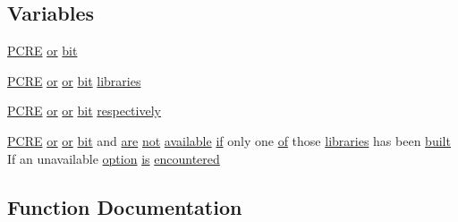 \subsection*{Variables}
\begin{DoxyCompactItemize}
\item 
\hyperlink{pcre_8txt_a970782a5ef22596881e664deb789f171}{P\+C\+RE} \hyperlink{pcretest_8txt_a1e1dbf0220a28f9a8c394172dd6da171}{or} \hyperlink{pcre-config_8txt_aeddb586b79a44fb202dde924852cbbf6}{bit}
\item 
\hyperlink{pcre_8txt_a970782a5ef22596881e664deb789f171}{P\+C\+RE} \hyperlink{pcretest_8txt_a1e1dbf0220a28f9a8c394172dd6da171}{or} \hyperlink{pcretest_8txt_a1e1dbf0220a28f9a8c394172dd6da171}{or} \hyperlink{pcretest_8txt_aeddb586b79a44fb202dde924852cbbf6}{bit} \hyperlink{pcre-config_8txt_a0534839528d024a80d06be3b3047e856}{libraries}
\item 
\hyperlink{pcre_8txt_a970782a5ef22596881e664deb789f171}{P\+C\+RE} \hyperlink{pcretest_8txt_a1e1dbf0220a28f9a8c394172dd6da171}{or} \hyperlink{pcretest_8txt_a1e1dbf0220a28f9a8c394172dd6da171}{or} \hyperlink{pcretest_8txt_aeddb586b79a44fb202dde924852cbbf6}{bit} \hyperlink{pcre-config_8txt_a31b9ef249a90b01994c2c4d8b61ccace}{respectively}
\item 
\hyperlink{pcre_8txt_a970782a5ef22596881e664deb789f171}{P\+C\+RE} \hyperlink{pcretest_8txt_a1e1dbf0220a28f9a8c394172dd6da171}{or} \hyperlink{pcretest_8txt_a1e1dbf0220a28f9a8c394172dd6da171}{or} \hyperlink{pcretest_8txt_aeddb586b79a44fb202dde924852cbbf6}{bit} and \hyperlink{pcre_8txt_a98da773651c0ef9992aa9a7bab588058}{are} \hyperlink{pcre_8txt_aab236af6334f68eebb41dff13921475a}{not} \hyperlink{pcretest_8txt_a4535630baf343422449d0c4d3f6d0ae7}{available} \hyperlink{util__expr__scan_8c_aa1a71763978093648dffef60b56f7447}{if} only one \hyperlink{pcre_8txt_a9d5b55a535a7d176d14b62d664b47b4d}{of} those \hyperlink{pcre_8txt_ae4aecc72ae4789d0b7d4d9280e7679a1}{libraries} has been \hyperlink{pcretest_8txt_a441b0f5d179bd730727fd325dfe75401}{built} If an unavailable \hyperlink{pcretest_8txt_a737bdf2e23a8aca3ce89e79e9df35b3e}{option} \hyperlink{NON-AUTOTOOLS-BUILD_8txt_a2569119f3fd3f0d7d7ecea3c96acb0bf}{is} \hyperlink{pcre-config_8txt_ad131c8125f6c9158692263842c7bcbf3}{encountered}
\end{DoxyCompactItemize}


\subsection{Function Documentation}
